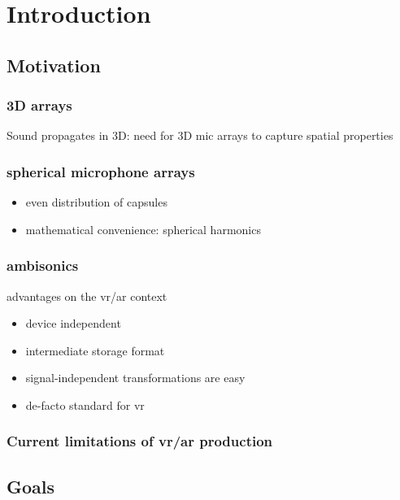 \chapter{Introduction}


\section{Motivation}

\subsection{3D arrays}

Sound propagates in 3D: need for 3D mic arrays to capture spatial properties



\subsection{spherical microphone arrays}

\begin{itemize}
  \item even distribution of capsules
  \item mathematical convenience: spherical harmonics
\end{itemize}



\subsection{ambisonics}

advantages on the vr/ar context
\begin{itemize}
  \item device independent
  \item intermediate storage format
  \item signal-independent transformations are easy
  \item de-facto standard for vr
\end{itemize}

\subsection{Current limitations of vr/ar production}


\section{Goals}

